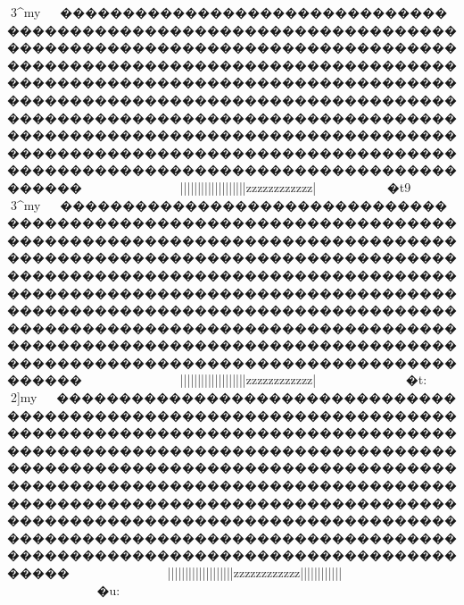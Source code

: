 {{{{{{{{{{{{{{{{{{{{{{{{{{{{{{{{{{{{{{{{{{{{{{{{{{{{{{{{{{{{{{{{{{{{{{{{{{{{{{{{{{{{{{{{{{{{{{{{{{{{{{{{{{{{{{{{{{{{{{{{{{{{{{{{{{{{{{{{{{{{{{{{{{{{{{{{{{{{{{{{{{{{{{{{{{{{{{{{{{{{{{{{{{{{{{{{{{{{{{{{{{{{{{{{{{{{{{{{{{{{{{{{{{{{{{{{{{{{{{{{{{{{{{{{{{{{{{{{{{{{{{{{{{{{{{{{{{{{{{{{{{{{{{{{{{{{{{{{{{{{{{{{{{{{{{{{{{{{{{{{{{{{{{{{{{{{{{{{{{{{{{{{{{{{{{{{{{{{{{{{{{{{{{{{{{{{{{{{{{{{{{{{{{{{{{{{{{{{{{{{{{{{{{{{{{{{{{{{{{{{{{{{{{{{{{{{{{{{{{{{{{{{{{{{{{{{{{{{{{{{{{{{{{{{{{{{{{{{{{{{{{{{{{{{{{{{{{{{{{{{{{{{{{{{{{{{{{{{{{{{{{{{{{{{{{{{{{{{{{{{{{{{{{{{{{{{{{{{{{{{{{{{{{{{{{{{{{{{{{{{{{{{{{{{{{{{{{{{{{{{{{{{{{{{{{{{{{{{{{{{{{{{{{{{{{{{{{{{{{{{{{{{{{{{{{{{{{{{{{{{{{{{{{{{{{{{{{{{{{{{{{{{{{{{{{{{{{{{{{{{{{{{{{{{{{{{{{{{{{{{{{{{{{{{{{{{{{{{{{{{{{{{{{{{{{{{{{{{{{{{{{{{{{{{{3^my{}~~�������������������������������������������������������������������������������������������������������������������������������������������������������������������������������������������������������������������������������������������������������������������������������������������������������������������������������������������������������������������������~~~~~~~~~~~~~~}}}|||||||||||||||||||{{{{zzzzzzzzzzzz{{{{{{{{{{{{{{{{{{{{{|}~~~~~~~~}}}�t9

3^my{}~~�������������������������������������������������������������������������������������������������������������������������������������������������������������������������������������������������������������������������������������������������������������������������������������������������������������������������������������������������������������������������~~~~~~~~~~~~~~}}}|||||||||||||||||||{{{{zzzzzzzzzzzz{{{{{{{{{{{{{{{{{{{{{|}~~~~~~~~~~~�t:
	
2]my{}~~�������������������������������������������������������������������������������������������������������������������������������������������������������������������������������������������������������������������������������������������������������������������������������������������������������������������������������������������������������������������������~~~~~~~~~~~~~~}}}|||||||||||||||||||{{{{zzzzzzzzzzzz{{{{{{|{||||||||||{{{|}~~~~~~~~~~~�u:
}}}}}}}}}}}}}}}}}}}}}}}}}}}}}}}}}}}}}}}}}}}}}}}}}}}}}}}}}}}}}}}}}}}}}}}}}}}}}}}}}}}}}}}}}}}}}}}}}}}}}}}}}}}}}}}}}}}}}}}}}}}}}}}}}}}}}}}}}}}}}}}}}}}}}}}}}}}}}}}}}}}}}}}}}}}}}}}}}}}}}}}}}}}}}}}}}}}}}}}}}}}}}}}}}}}}}}}}}}}}}}}}}}}}}}}}}}}}}}}}}}}}}}}}}}}}}}}}}}}}}}}}}}}}}}}}}}}}}}}}}}}}}}}}}}}}}}}}}}}}}}}}}}}}}}}}}}}}}}}}}}}}}}}}}}}}}}}}}}}}}}}}}}}}}}}}}}}}}}}}}}}}}}}}}}}}}}}}}}}}}}}}}}}}}}}}}}}}}}}}}}}}}}}}}}}}}}}}}}}}}}}}}}}}}}}}}}}}}}}}}}}}}}}}}}}}}}}}}}}}}}}}}}}}}}}}}}}}}}}}}}}}}}}}}}}}}}}}}}}}}}}}}}}}}}}}}}}}}}}}}}}}}}}}}}}}}}}}}}}}}}}}}}}}}}}}}}}}}}}}}}}}}}}}}}}}}}}}}}}}}}}}}}}}}}}}}}}}}}}}}}}}}}}}}}}}}}}}}}}}}}}}}}}}}}}}}}}}}}}}}}}}}}}}}}}}}}}}}}}}}}}}}}}}}}}}}}}}}}}}}}}}}}}}}}}}}}}}}}}}}}}}}}}}}}}}}}}}}}}}}}}}}}}}}}}}}}}}}}}}}}}}}}}}}}}}}}}}}}}}}}}}}}}}}}}}}}}}}}}}}}}}}}}}}}}}}}}}}}}}}}}}}}}}}}}}}}}}}}
